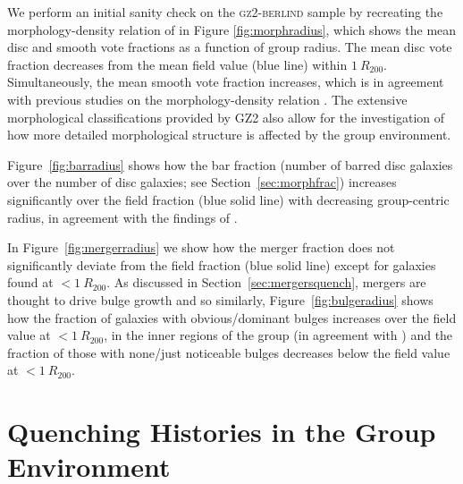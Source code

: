 \documentclass[useAMS,usenatbib]{mn2e}
\begin{document}
We perform an initial sanity check on the \textsc{gz2-berlind} sample by recreating the morphology-density relation of \citet{dressler80} in Figure \ref{fig:morphradius}, which shows the mean disc and smooth vote fractions as a function of group radius.  The mean disc vote fraction decreases from the mean field value (blue line) within $1~R_{200}$. Simultaneously, the mean smooth vote fraction increases, which is in agreement with previous studies on the morphology-density relation \citep{dressler80, smail97, poggianti99, postman05, Bamford09}. The extensive morphological classifications provided by GZ2 also allow for the investigation of how more detailed morphological structure is affected by the group environment.  

Figure~\ref{fig:barradius} shows how the bar fraction (number of barred disc galaxies over the number of disc galaxies; see Section~\ref{sec:morphfrac}) increases significantly over the field fraction (blue solid line) with decreasing group-centric radius, in agreement with the findings of \cite{barazza09}. 

In Figure~\ref{fig:mergerradius} we show how the merger fraction does not significantly deviate from the field fraction (blue solid line) except for galaxies found at $< 1~R_{200}$. As discussed in Section~\ref{sec:mergersquench}, mergers are thought to drive bulge growth and so similarly, Figure~\ref{fig:bulgeradius} shows how the fraction of galaxies with obvious/dominant bulges increases over the field value at $< 1~R_{200}$, in the inner regions of the group (in agreement with \citealt{diaferio01}) and the fraction of those with none/just noticeable bulges decreases below the field value at $< 1~R_{200}$. 


\section{Quenching Histories in the Group Environment}\label{sec:starpy}
\end{document}
